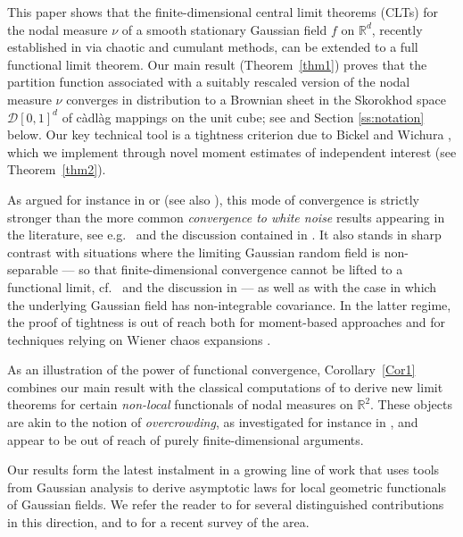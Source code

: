 \documentclass[11pt,a4paper]{article}
\newcommand\jump{\par\medskip}
\numberwithin{equation}{section}
\theoremstyle{plain}
\theoremstyle{plain}
\theoremstyle{plain}
\theoremstyle{plain}
\theoremstyle{definition}
\theoremstyle{definition}
\begin{document}
This paper shows that the finite-dimensional central limit theorems (CLTs) 
for the nodal measure $\nu$ of a smooth stationary Gaussian field 
$f$ on $\mathbb{R}^d$, recently established in \cite{Gas25, Anc24} via chaotic and cumulant 
methods, can be extended to a full functional limit theorem. 
Our main result (Theorem~\ref{thm1}) proves that the partition function 
associated with a suitably rescaled version of the nodal measure $\nu$ converges in 
distribution to a Brownian sheet in the Skorokhod space $\mathcal{D}[0,1]^d$ 
of c\`adl\`ag mappings on the unit cube; see \cite{neuhaus} and Section \ref{ss:notation} below. 
Our key technical tool is a tightness criterion due to Bickel and Wichura 
\cite{Bic71}, which we implement through novel moment estimates of 
independent interest (see Theorem~\ref{thm2}).

As argued for instance in \cite[Appendix A]{NoPeVidotto} or \cite[Appendix A.4]{Smutek} (see also \cite{IvanovUkra}), this mode of 
convergence is strictly stronger than the more common {\it convergence 
to white noise} results appearing in the literature, see e.g.\ 
\cite{Smutek, AnconaLetendreKostlan, NoPeVidotto} and the discussion contained in \cite[Section 1.5]{Wigman2010}. 
It also stands in sharp contrast with situations where the limiting 
Gaussian random field is non-separable --- so that finite-dimensional 
convergence cannot be lifted to a functional limit, cf.\ 
\cite{SodinBuckley, SodinTsirelson} and the discussion in 
\cite{NoPeVidotto} --- as well as with the case in which the underlying 
Gaussian field has non-integrable covariance. 
In the latter regime, the proof of tightness is out of reach both for 
moment-based approaches and for techniques relying on Wiener chaos 
expansions \cite{NoPeVidotto}. 

As an illustration of the power of functional convergence, 
Corollary~\ref{Cor1} combines our main result with the classical 
computations of \cite{YehWiener} to derive new limit theorems for certain 
{\it non-local} functionals of nodal measures on $\mathbb{R}^2$. These objects are akin to 
the notion of {\it overcrowding}, as investigated for instance in 
\cite{Priya, overcrowding1, overcrowding2}, and appear to be out of reach of purely 
finite-dimensional arguments.\jump

Our results form the latest instalment in a growing line of work that uses tools from Gaussian analysis to derive asymptotic laws for local geometric functionals of Gaussian fields. We refer the reader to \cite{Kleon, NouPecRossi, MaRoPeccati, DaNouPecRossi, DierickxNouPecRos, AnconaLetendreKostlan, Gas25, PeccatiVidotto} for several distinguished contributions in this direction, and to \cite{WigmanSurvey} for a recent survey of the area.
\end{document}
